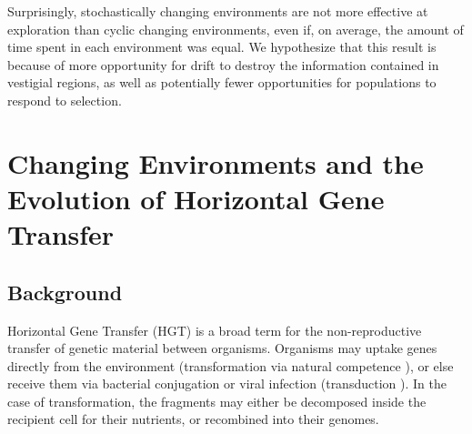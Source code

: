 \documentclass[PhD]{msu-thesis}
\begin{document}
Surprisingly, stochastically changing environments are not more effective at exploration
than cyclic changing environments, even if, on average, the amount of time spent in each environment was equal. We hypothesize that this result is because of more opportunity for drift to destroy the information contained in vestigial regions, as well as potentially fewer opportunities for populations to respond to selection.





\chapter{Changing Environments and the Evolution of Horizontal Gene Transfer}
\label{chap:evo-hgt}
\section{Background}

Horizontal Gene Transfer (HGT) is a broad term for the non-reproductive transfer of genetic material between organisms. Organisms may uptake genes directly from the environment (transformation via natural competence \cite{chen_dna_2004}), or else receive them via bacterial conjugation\cite{lederberg_gene_1946} or viral infection (transduction \cite{zinder_genetic_1952,lennox_transduction_1955}). In the case of transformation, the fragments may either be decomposed inside the recipient cell for their nutrients, or recombined into their genomes. 
\end{document}
